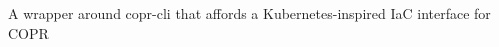 \begin{project}

  \begin{projectdescription}
    A wrapper around copr-cli that affords a Kubernetes-inspired IaC interface for COPR
  \end{projectdescription}
\end{project}
